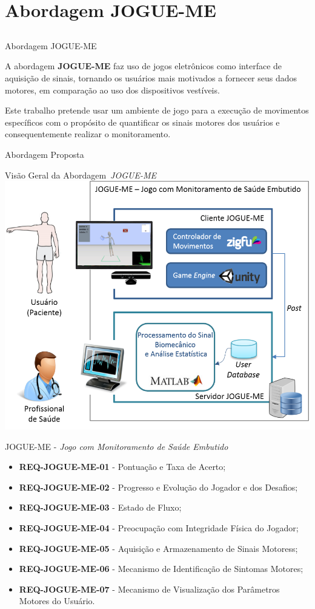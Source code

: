 \documentclass{beamer}
\begin{document}
\section{Abordagem JOGUE-ME}
\subsection{}
\begin{frame}{Abordagem JOGUE-ME}
    \begin{block}{}
    A abordagem \textbf{JOGUE-ME} faz uso de jogos eletrônicos como interface de aquisição de sinais, tornando os usuários mais motivados a fornecer seus dados motores, em comparação ao uso dos dispositivos vestíveis.
    \end{block}
    
    
    \begin{block}{}
    Este trabalho pretende usar um ambiente de jogo para a execução de movimentos específicos com o propósito de quantificar os sinais motores dos usuários e consequentemente realizar o monitoramento. 
    \end{block}
\end{frame}

\begin{frame}{Abordagem Proposta}
  \begin{block}{Visão Geral da Abordagem~\textit{JOGUE-ME}}
      \center \includegraphics[height=1.8 in]{img/visaosistema.png}
  \end{block}
\end{frame}


\begin{frame}{JOGUE-ME - \textit{Jogo com Monitoramento de Saúde Embutido}}
	\begin{block}{}
		\begin{itemize}[<+->]
			\item	\textbf{REQ-JOGUE-ME-01} - Pontuação e Taxa de Acerto;
			\item	\textbf{REQ-JOGUE-ME-02} - Progresso e Evolução do Jogador e dos Desafios;
			\item	\textbf{REQ-JOGUE-ME-03} - Estado de Fluxo;
			\item	\textbf{REQ-JOGUE-ME-04} - Preocupação com Integridade Física do Jogador;
			\item	\textbf{REQ-JOGUE-ME-05} - Aquisição e Armazenamento de Sinais Motoress;
			\item	\textbf{REQ-JOGUE-ME-06} - Mecanismo de Identificação de Sintomas Motores;
			\item	\textbf{REQ-JOGUE-ME-07} - Mecanismo de Visualização dos Parâmetros Motores do Usuário.
		\end{itemize}
	\end{block}
\end{frame}
\end{document}
